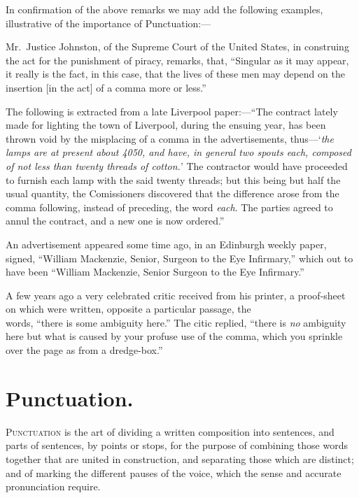 In confirmation of the above remarks we may add the following examples,
illustrative of the importance of Punct\-uation:---

\begin{example}
    Mr.\ Justice Johnston, of the Supreme Court of the United States, in
    construing the act for the punishment of piracy, remarks, that, ``Singular
    as it may appear, it really is the fact, in this case, that the lives of
    these men may depend on the insertion [in the act] of a comma more or
    less.''

    The following is extracted from a late Liverpool paper:---``The contract
    lately made for lighting the town of Liverpool, during the ensuing year, has
    been thrown void by the misplacing of a comma in the advertisements,
    thus---`{\em{}the lamps are at present about 4050, and have, in general two
    spouts each, composed of not less than twenty threads of cotton.}' The
    contractor would have proceeded to furnish each lamp with the said twenty
    threads; but this being but half the usual quantity, the Comissioners
    discovered that the difference arose from the comma following, instead of
    preceding, the word \emph{each}. The parties agreed to annul the contract,
    and a new one is now ordered.''

    An advertisement appeared some time ago, in an Edinburgh weekly paper,
    signed, ``William Mackenzie, Senior, Surgeon to the Eye Infirmary,'' which
    out to have been ``William Mackenzie, Senior Surgeon to the Eye Infirmary.''

    A few years ago a very celebrated critic received from his printer, a
    proof-sheet on which were written, opposite a particular passage, the\\words,
    ``there is some ambiguity here.'' The citic replied, ``there is \emph{no}
    ambiguity here but what is caused by your profuse use of the comma, which
    you sprinkle over the page as from a dredge-box.''
\end{example}

\section{Punctuation.}
\textsc{Punctuation} is the art of dividing a written composition into
sentences, and parts of sentences, by points or stops, for the purpose of
combining those words together that are united in construction, and separating
those which are distinct; and of marking the different pauses of the voice,
which the sense and accurate pronunciation require.

